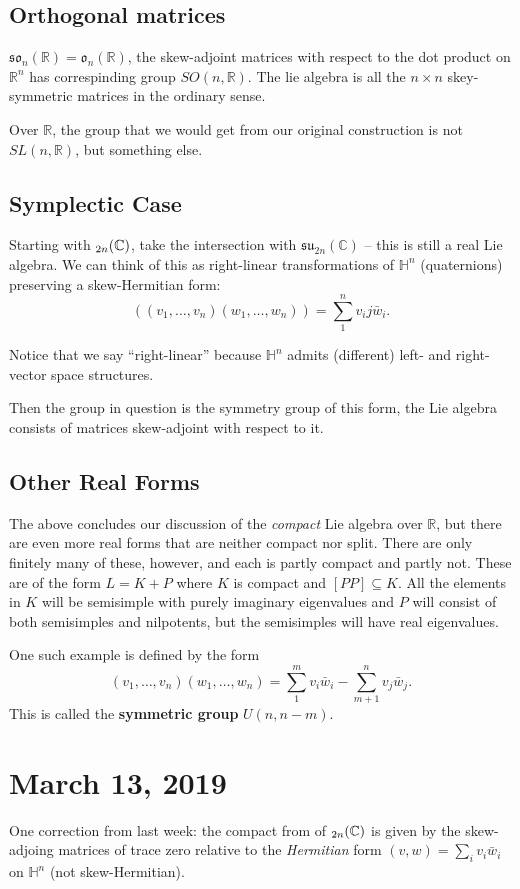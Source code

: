 \documentclass[12pt]{article}
\theoremstyle{nonumberbreak}
\theoremstyle{changebreak}
\theoremstyle{nonumberbreak}
\theoremstyle{change}
\newcommand*{\R}{
\mathbb{R}
}
\newcommand*{\C}{
\mathbb{C}
}
\let\sp\relax
\DeclareMathOperator{\sp}{\mathfrak{sp}}
\begin{document}
\subsection{Orthogonal matrices}
$\mathfrak{so}_n(\R)=\mathfrak{o}_n(\R)$, the skew-adjoint matrices with respect to the dot product on $\R^n$ has correspinding group $SO(n,\R)$.
The lie algebra is all the $n\times n$ skey-symmetric matrices in the ordinary sense.

Over $\R$, the group that we would get from our original construction is not $SL(n,\R)$, but something else.

\subsection{Symplectic Case}
Starting with $\sp_{2n}(\C)$, take the intersection with $\mathfrak{su}_{2n}(\C)$ -- this is still a real Lie algebra.
We can think of this as right-linear transformations of $\mathbb{H}^n$ (quaternions) preserving a skew-Hermitian form:
\[((v_1,\dots,v_n)(w_1,\dots,w_n))=\sum_1^nv_ij\bar w_i.\]

Notice that we say ``right-linear'' because $\mathbb{H}^n$ admits (different) left- and right-vector space structures.

Then the group in question is the symmetry group of this form, the Lie algebra consists of matrices skew-adjoint with respect to it.

\subsection{Other Real Forms}
The above concludes our discussion of the \textit{compact} Lie algebra over $\R$, but there are even 
more real forms that are neither compact nor split. There are only finitely many of these, however, and each is partly compact and partly not.
These are of the form $L=K+P$ where $K$ is compact and $[PP]\subseteq K$. All the elements in $K$ will be semisimple
with purely imaginary eigenvalues and $P$ will consist of both semisimples and nilpotents, but the semisimples will have 
real eigenvalues.

One such example is defined by the form 
\[(v_1,\dots,v_n)(w_1,\dots,w_n)=\sum_1^m v_i\bar w_i-\sum_{m+1}^n v_j\bar w_j.\]
This is called the \textbf{symmetric group} $U(n,n-m)$.

\section{March 13, 2019}
One correction from last week: the compact from of $\sp_{2n}(\C)$ is given by the skew-adjoing matrices of trace zero relative to the \textit{Hermitian}
form $(v,w)=\sum_iv_i\bar w_i$ on $\mathbb{H}^n$ (not skew-Hermitian).
\end{document}
